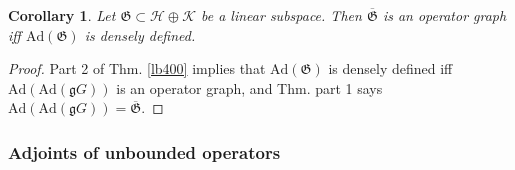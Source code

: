 \documentclass[12pt,b5paper,notitlepage]{article}
\theoremstyle{definition}
\newtheorem{df}{Definition}[subsection]
\newtheorem{eg}[df]{Example}
\theoremstyle{plain}
\newtheorem{thm}[df]{Theorem}
\newtheorem{co}[df]{Corollary}
\newcommand{\fk}{\mathfrak}
\newcommand{\ovl}{\overline}
\newcommand{\gk}{\mathfrak g}
\newcommand{\Ad}{\mathrm{Ad}}
\newcommand{\Jbb}{\mathbb J}
\newcommand{\Ker}{\mathrm{Ker}}
\newcommand{\Rng}{\mathrm{Rng}}
\newcommand{\MH}{\mathcal H}
\newcommand{\MK}{\mathcal K}
\newcommand{\SG}{\mathscr G}
\numberwithin{equation}{section}
\begin{document}
\begin{co}\label{lb401}
Let $\fk G\subset\MH\oplus\MK$ be a linear subspace. Then $\ovl{\fk G}$ is an operator graph iff $\Ad(\fk G)$ is densely defined.
\end{co}

\begin{proof}
Part 2 of Thm. \ref{lb400} implies that $\Ad(\fk G)$ is densely defined iff $\Ad(\Ad(\gk G))$ is an operator graph, and Thm. part 1 says $\Ad(\Ad(\gk G))=\ovl{\fk G}$.
\end{proof}


\begin{comment}
\begin{df}
For each linear subspace $\fk F\subset\MH\oplus\MK$, define
\begin{align*}
\Ker(\fk G)=\{\xi\in\MH:\xi\oplus 0\in \fk G\}\qquad\Rng(\fk G)=\{\eta\in\MK:\xi\oplus\eta\in\fk G\text{ for some }\xi\in\MH\}
\end{align*}
\end{df}

\begin{eg}
If $T:\MH\rightarrow\MK$ be an n.d.d. unbounded operator, then $\Ker(\SG(T))=\Ker(T)$ and $\Rng(\SG(T))=\Rng(T)$.
\end{eg}




\begin{thm}
Let $\fk G\subset\MH\oplus\MK$ be a linear subspace. Then
\begin{align*}
\Ker(\Ad(\fk G))=\Rng(\fk G)^\perp
\end{align*}
In particular, $\Ker(\Ad(\fk G))$ is a closed linear subspace of $\MK$.
\end{thm}

\begin{proof}
Let $\eta\in\MK$. Then $\eta\in\Ker(\Ad(\fk G))$ iff $\eta\oplus0\in\Jbb\fk G^\perp$, iff $0\oplus\eta\in\fk G^\perp$, iff $0\oplus\eta$ is orthogonal to all $\xi\oplus\phi\in\fk G$, iff $\eta\perp\phi$ whenever $\xi\oplus\phi\in\fk G$, iff $\eta\in\Rng(\fk G)$.
\end{proof}

\end{comment}


\subsubsection{Adjoints of unbounded operators}
\end{document}
